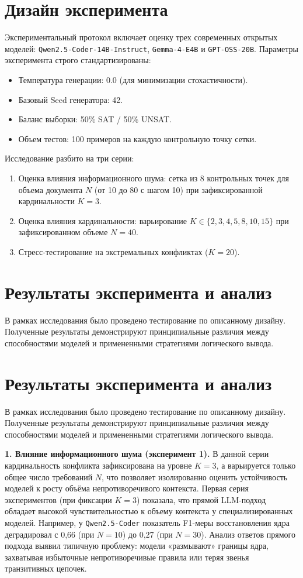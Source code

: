 \section{Дизайн эксперимента}
Экспериментальный протокол включает оценку трех современных открытых моделей: \texttt{Qwen2.5-Coder-14B-Instruct}, \texttt{Gemma-4-E4B} и \texttt{GPT-OSS-20B}. 
Параметры эксперимента строго стандартизированы: 
\begin{itemize}
    \item Температура генерации: 0.0 (для минимизации стохастичности).
    \item Базовый Seed генератора: 42.
    \item Баланс выборки: 50\% SAT / 50\% UNSAT.
    \item Объем тестов: 100 примеров на каждую контрольную точку сетки.
\end{itemize}

Исследование разбито на три серии:
\begin{enumerate}
    \item Оценка влияния информационного шума: сетка из 8 контрольных точек для объема документа $N$ (от 10 до 80 с шагом 10) при зафиксированной кардинальности $K=3$.
    \item Оценка влияния кардинальности: варьирование $K \in \{2, 3, 4, 5, 8, 10, 15\}$ при зафиксированном объеме $N=40$.
    \item Стресс-тестирование на экстремальных конфликтах ($K=20$).
\end{enumerate}



\section{Результаты эксперимента и анализ}
В рамках исследования было проведено тестирование по описанному дизайну. Полученные результаты демонстрируют принципиальные различия между способностями моделей и примененными стратегиями логического вывода.

\section{Результаты эксперимента и анализ}
В рамках исследования было проведено тестирование по описанному дизайну. Полученные результаты демонстрируют принципиальные различия между способностями моделей и примененными стратегиями логического вывода.

\textbf{1. Влияние информационного шума (эксперимент 1).}
В данной серии кардинальность конфликта зафиксирована на уровне $K=3$, а варьируется только общее число требований $N$, что позволяет изолированно оценить устойчивость моделей к росту объёма непротиворечивого контекста.
Первая серия экспериментов (при фиксации $K=3$) показала, что прямой LLM-подход обладает высокой чувствительностью к объему контекста у специализированных моделей. Например, у \texttt{Qwen2.5-Coder} показатель F1-меры восстановления ядра деградировал с 0,66 (при $N=10$) до 0,27 (при $N=30$). Анализ ответов прямого подхода выявил типичную проблему: модели «размывают» границы ядра, захватывая избыточные непротиворечивые правила или теряя звенья транзитивных цепочек. 

